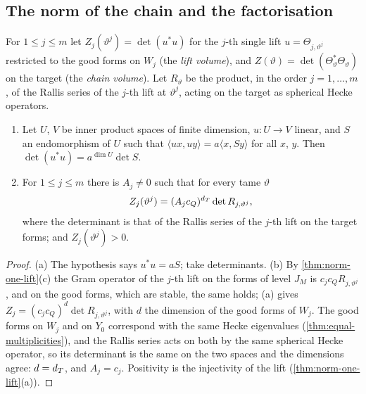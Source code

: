 \subsection{The norm of the chain and the factorisation}\label{ss:chain-norm}
For $1\le j\le m$ let $Z_j(\vartheta^j)=\det(u^*u)$ for the $j$-th single lift $u=\Theta_{j,\vartheta^j}$ restricted to the good forms on $W_j$ (the \emph{lift volume}), and $Z(\vartheta)=\det(\Theta_\vartheta^*\Theta_\vartheta)$ on the target (the
\emph{chain volume}). Let $R_\vartheta$ be the product, in the order $j=1,\dots,m$, of the Rallis series of the $j$-th lift at $\vartheta^j$, acting on the target as spherical Hecke operators.

\begin{lemma}[Volumes]\label{lem:volumes}
\begin{enumerate}[label=\textup{(\alph*)}]
\item Let $U$, $V$ be inner product spaces of finite dimension, $u\colon U\to V$ linear, and $S$ an endomorphism of $U$ such that $\langle ux,uy\rangle=a\langle x,Sy\rangle$ for all $x$, $y$.
Then $\det(u^*u)=a^{\dim U}\det S$.
\item For $1\le j\le m$ there is $A_j\ne0$ such that for every tame $\vartheta$
\[
  Z_j(\vartheta^j)=(A_jc_Q)^{d_T}\det R_{j,\vartheta^j},
\]
where the determinant is that of the Rallis series of the $j$-th lift on the target forms; and $Z_j(\vartheta^j)>0$.
\end{enumerate}
\end{lemma}

\begin{proof}
(a) The hypothesis says $u^*u=aS$; take determinants. (b) By \cref{thm:norm-one-lift}(c) the Gram operator of the $j$-th lift on the forms of level $J_M$ is $c_jc_QR_{j,\vartheta^j}$, and on the good forms, which are
stable, the same holds; (a) gives $Z_j=(c_jc_Q)^{d}\det R_{j,\vartheta^j}$, with $d$ the dimension of the good forms of $W_j$. The good forms on $W_j$ and on $Y_0$ correspond with the same Hecke eigenvalues (\cref{thm:equal-multiplicities}), and
the Rallis series acts on both by the same spherical Hecke operator, so its determinant is the same on the two spaces and the dimensions agree: $d=d_T$, and $A_j=c_j$. Positivity is the injectivity of the lift (\cref{thm:norm-one-lift}(a)).
\end{proof}

